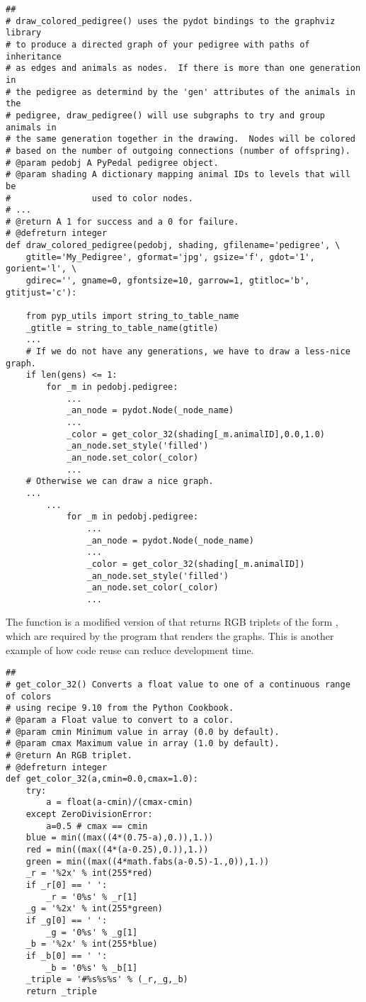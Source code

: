 \begin{verbatim}
##
# draw_colored_pedigree() uses the pydot bindings to the graphviz library
# to produce a directed graph of your pedigree with paths of inheritance
# as edges and animals as nodes.  If there is more than one generation in
# the pedigree as determind by the 'gen' attributes of the animals in the
# pedigree, draw_pedigree() will use subgraphs to try and group animals in
# the same generation together in the drawing.  Nodes will be colored
# based on the number of outgoing connections (number of offspring).
# @param pedobj A PyPedal pedigree object.
# @param shading A dictionary mapping animal IDs to levels that will be
#                used to color nodes.
# ...
# @return A 1 for success and a 0 for failure.
# @defreturn integer
def draw_colored_pedigree(pedobj, shading, gfilename='pedigree', \
    gtitle='My_Pedigree', gformat='jpg', gsize='f', gdot='1', gorient='l', \
    gdirec='', gname=0, gfontsize=10, garrow=1, gtitloc='b', gtitjust='c'):

    from pyp_utils import string_to_table_name
    _gtitle = string_to_table_name(gtitle)
    ...
    # If we do not have any generations, we have to draw a less-nice graph.
    if len(gens) <= 1:
        for _m in pedobj.pedigree:
            ...
            _an_node = pydot.Node(_node_name)
            ...
            _color = get_color_32(shading[_m.animalID],0.0,1.0)
            _an_node.set_style('filled')
            _an_node.set_color(_color)
            ...
    # Otherwise we can draw a nice graph.
    ...
        ...
            for _m in pedobj.pedigree:
                ...
                _an_node = pydot.Node(_node_name)
                ...
                _color = get_color_32(shading[_m.animalID])
                _an_node.set_style('filled')
                _an_node.set_color(_color)
                ...
\end{verbatim}
The  function is a modified version of  that returns RGB triplets of the form , which are required by the program that renders the graphs.  This is another example of how code reuse can reduce development time.
\begin{verbatim}
##
# get_color_32() Converts a float value to one of a continuous range of colors
# using recipe 9.10 from the Python Cookbook.
# @param a Float value to convert to a color.
# @param cmin Minimum value in array (0.0 by default).
# @param cmax Maximum value in array (1.0 by default).
# @return An RGB triplet.
# @defreturn integer
def get_color_32(a,cmin=0.0,cmax=1.0):
    try:
        a = float(a-cmin)/(cmax-cmin)
    except ZeroDivisionError:
        a=0.5 # cmax == cmin
    blue = min((max((4*(0.75-a),0.)),1.))
    red = min((max((4*(a-0.25),0.)),1.))
    green = min((max((4*math.fabs(a-0.5)-1.,0)),1.))
    _r = '%2x' % int(255*red)
    if _r[0] == ' ':
        _r = '0%s' % _r[1]
    _g = '%2x' % int(255*green)
    if _g[0] == ' ':
        _g = '0%s' % _g[1]
    _b = '%2x' % int(255*blue)
    if _b[0] == ' ':
        _b = '0%s' % _b[1]
    _triple = '#%s%s%s' % (_r,_g,_b)
    return _triple
\end{verbatim}
